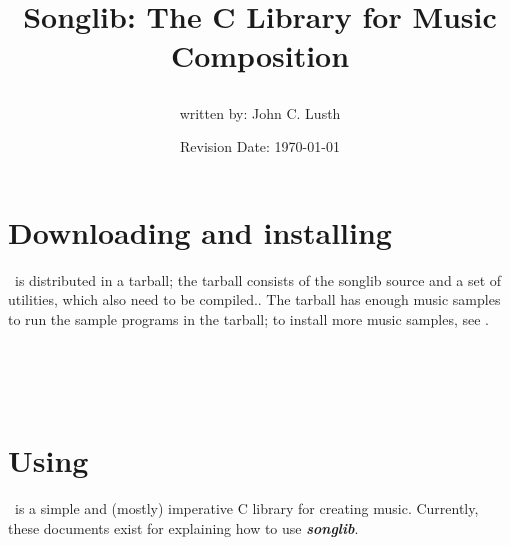 \documentclass{article}
\title{Songlib: The C Library for Music Composition\\
\date{Revision Date: \today}}
\author{written by: John C. Lusth}
\begin{document}
\maketitle

\W\subsubsection*{}
\W\htmlrule

\section*{Downloading and installing \songlib}

\Songlib\ is distributed in a tarball; the tarball
consists of the songlib source and a set of 
utilities, which also need to be compiled..
The tarball has enough music samples
to run the sample programs in the tarball; to install more
music samples, see .

\\
\\
\\

\section{Using \songlib}

\Songlib\ is a simple and (mostly) imperative C
library for creating music. Currently, these documents
exist for explaining how to use {\it\bf songlib}.
\end{document}
